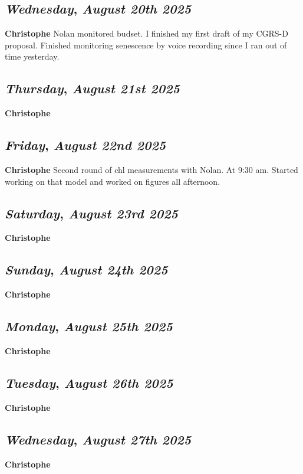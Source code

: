 \def\day{\textit{August 20th 2025}}
\def\weekday{\textit{Wednesday}}
\subsection*{\weekday, \day}
\textbf {Christophe}
Nolan monitored budset. I finished my first draft of my CGRS-D proposal. Finished monitoring senescence by voice recording since I ran out of time yesterday. 

\def\day{\textit{August 21st 2025}}
\def\weekday{\textit{Thursday}}
\subsection*{\weekday, \day}
\textbf {Christophe}

\def\day{\textit{August 22nd 2025}}
\def\weekday{\textit{Friday}}
\subsection*{\weekday, \day}
\textbf {Christophe}
Second round of chl measurements with Nolan. At 9:30 am. Started working on that model and worked on figures all afternoon. 

\def\day{\textit{August 23rd 2025}}
\def\weekday{\textit{Saturday}}
\subsection*{\weekday, \day}
\textbf {Christophe}

\def\day{\textit{August 24th 2025}}
\def\weekday{\textit{Sunday}}
\subsection*{\weekday, \day}
\textbf {Christophe}

\def\day{\textit{August 25th 2025}}
\def\weekday{\textit{Monday}}
\subsection*{\weekday, \day}
\textbf {Christophe}

\def\day{\textit{August 26th 2025}}
\def\weekday{\textit{Tuesday}}
\subsection*{\weekday, \day}
\textbf {Christophe}

\def\day{\textit{August 27th 2025}}
\def\weekday{\textit{Wednesday}}
\subsection*{\weekday, \day}
\textbf {Christophe}

